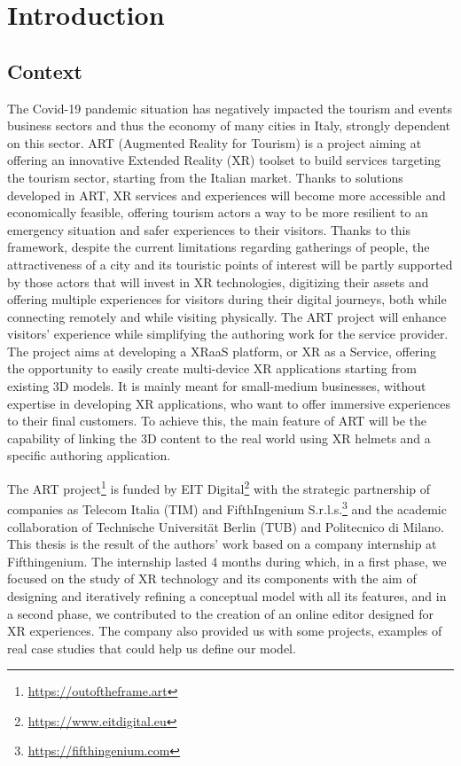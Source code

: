 \chapter{Introduction}

\section{Context}
The Covid-19 pandemic situation has negatively impacted the tourism and events business sectors and thus the economy of many cities in Italy, strongly dependent on this sector.
ART (Augmented Reality for Tourism) is a project aiming at offering an innovative Extended Reality (XR) toolset to build services targeting the tourism sector, starting from the Italian market.
Thanks to solutions developed in ART, XR services and experiences will become more accessible and economically feasible, offering tourism actors a way to be more resilient to an emergency situation and safer experiences to their visitors.
Thanks to this framework, despite the current limitations regarding gatherings of people, the attractiveness of a city and its touristic points of interest will be partly supported by those actors that will invest in XR technologies, digitizing their assets and offering multiple experiences for visitors during their digital journeys, both while connecting remotely and while visiting physically.
The ART project will enhance visitors’ experience while simplifying the authoring work for the service provider. The project aims at developing a XRaaS platform, or XR as a Service, offering the opportunity to easily create multi-device XR applications starting from existing 3D models. It is mainly meant for small-medium businesses, without expertise in developing XR applications, who want to offer immersive experiences to their final customers. To achieve this, the main feature of ART will be the capability of linking the 3D content to the real world using XR helmets and a specific authoring application.

The ART project\footnote{\url{https://outoftheframe.art}} is funded by EIT Digital\footnote{\url{https://www.eitdigital.eu}} with the strategic partnership of companies as Telecom Italia (TIM) and FifthIngenium S.r.l.s.\footnote{\url{https://fifthingenium.com}} and the academic collaboration of Technische Universität Berlin (TUB) and Politecnico di Milano. This thesis is the result of the authors' work based on a company internship at Fifthingenium. 
The internship lasted 4 months during which, in a first phase, we focused on the study of XR technology and its components with the aim of designing and iteratively refining a conceptual model with all its features, and in a second phase, we contributed to the creation of an online editor designed for XR experiences.
The company also provided us with some projects, examples of real case studies that could help us define our model. 

